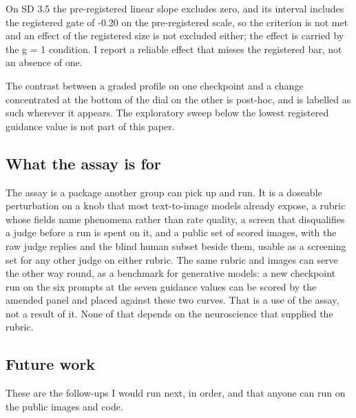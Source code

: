 \documentclass[11pt]{article}
\begin{document}
On SD 3.5 the pre-registered linear slope excludes zero, and its interval
includes the registered gate of -0.20 on the pre-registered scale, so the
criterion is not met and an effect of the registered size is not excluded
either; the effect is carried by the g = 1 condition. I report a reliable effect
that misses the registered bar, not an absence of one.

The contrast between a graded profile on one checkpoint and a change
concentrated at the bottom of the dial on the other is post-hoc, and is labelled
as such wherever it appears. The exploratory sweep below the lowest registered
guidance value is not part of this paper.

\subsection{What the assay is for}\label{what-the-assay-is-for}

The assay is a package another group can pick up and run. It is a doseable
perturbation on a knob that most text-to-image models already expose, a rubric
whose fields name phenomena rather than rate quality, a screen that disqualifies
a judge before a run is spent on it, and a public set of scored images, with the
raw judge replies and the blind human subset beside them, usable as a screening
set for any other judge on either rubric. The same rubric and images can serve
the other way round, as a benchmark for generative models: a new checkpoint run
on the six prompts at the seven guidance values can be scored by the amended
panel and placed against these two curves. That is a use of the assay, not a
result of it. None of that depends on the neuroscience that supplied the rubric.

\subsection{Future work}\label{future-work}

These are the follow-ups I would run next, in order, and that anyone can run on
the public images and code.
\end{document}
